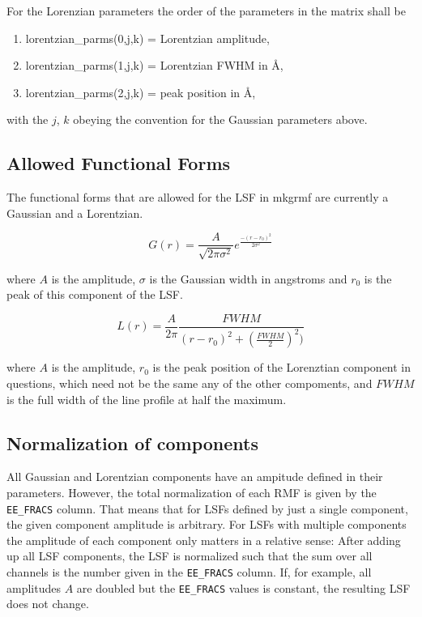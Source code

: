 \documentclass[twoside]{article}
\begin{document}
%
%
%

For the Lorenzian parameters the order of the parameters in the matrix
shall be

\begin{enumerate}
\item lorentzian\_parms(0,j,k) = Lorentzian amplitude,

\item lorentzian\_parms(1,j,k) = Lorentzian FWHM in \AA,

\item lorentzian\_parms(2,j,k) = peak position in \AA,
\end{enumerate}
with the $j$, $k$ obeying the convention for the Gaussian
parameters above.

\subsection{Allowed Functional Forms}

The functional forms that are allowed for the LSF in mkgrmf are
currently a Gaussian and a Lorentzian.

\begin{equation}\label{eqn:gauss}
  G(r) = \frac{A}{\sqrt{2\pi\sigma^2}} e^{\frac{-(r-r_0)^2}{2\sigma^2}}
\end{equation}

where $A$ is the amplitude, $\sigma$ is the Gaussian width in
angstroms and $r_0$ is the peak of this component of the LSF.

\begin{equation}\label{eqn:lorentz}
  L(r) = \frac{A}{2\pi} \frac{FWHM}{(r - r_0)^2 + \left(\frac{FWHM}{2}\right)^2)}
\end{equation}

where $A$ is the amplitude, $r_0$ is the peak position of the
Lorenztian component in questions, which need not be the same any of
the other compoments, and $FWHM$ is the full width of the line profile
at half the maximum.

\subsection{Normalization of components}
All Gaussian and Lorentzian components have an ampitude defined in
their parameters. However, the total normalization of each RMF is
given by the \texttt{EE\_FRACS} column. That means that for LSFs
defined by just a single component, the given component amplitude is
arbitrary. For LSFs with multiple components the amplitude of each
component only matters in a relative sense: After adding up all LSF
components, the LSF is normalized such that the sum over all channels
is the number given in the \texttt{EE\_FRACS} column. If, for example,
all amplitudes $A$ are doubled but the \texttt{EE\_FRACS} values is
constant, the resulting LSF does not change.
\end{document}
